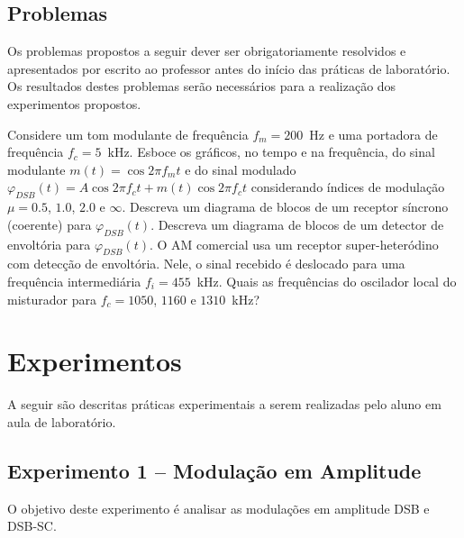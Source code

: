 \documentclass[12pt,addpoints]{exam}
\begin{document}
\subsection{Problemas}

Os problemas propostos a seguir dever ser obrigatoriamente resolvidos e apresentados por escrito ao professor antes do início das práticas de laboratório. Os resultados destes problemas serão necessários para a realização dos experimentos propostos. 

\begin{questions}
  \question Considere um tom modulante de frequência $f_{m} = 200$~Hz e uma portadora de frequência $f_{c} = 5$~kHz. Esboce os gráficos, no tempo e na frequência, do sinal modulante $m(t) = \cos{2\pi f_{m}t}$ e do sinal modulado $\varphi_{DSB}(t) = A\cos{2\pi f_{c}t} + m(t)\cos{2\pi f_{c}t}$ considerando índices de modulação $\mu = 0.5$, $1.0$, $2.0$ e $\infty$. %
  \question Descreva um diagrama de blocos de um receptor síncrono (coerente) para $\varphi_{DSB}(t)$.
  \question Descreva um diagrama de blocos de um detector de envoltória para $\varphi_{DSB}(t)$.
  \question O AM comercial usa um receptor super-heteródino com detecção de envoltória. Nele, o sinal recebido é deslocado para uma frequência intermediária $f_{i} = 455$~kHz. Quais as frequências do oscilador local do misturador para $f_{c} = 1050$, $1160$ e $1310$~kHz?
\end{questions}

\section{Experimentos}

A seguir são descritas práticas experimentais a serem realizadas pelo aluno em aula de laboratório. 

\subsection{Experimento 1 -- Modulação em Amplitude}

O objetivo deste experimento é analisar as modulações em amplitude DSB e DSB-SC.
\end{document}
